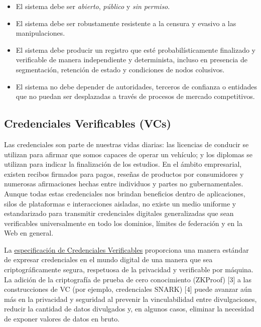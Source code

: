 \documentclass[11pt]{article}
\begin{document}
\begin{itemize}
	\item El sistema debe ser \textit{abierto}, \textit{público} y \textit{sin permiso}.

	\item El sistema debe ser robustamente resistente a la censura y evasivo a las manipulaciones.

	\item El sistema debe producir un registro que esté probabilísticamente finalizado y verificable de manera independiente y determinista, incluso en presencia de segmentación, retención de estado y condiciones de nodos colusivos.

	\item El sistema no debe depender de autoridades, terceros de confianza o entidades que no puedan ser desplazadas a través de procesos de mercado competitivos.

\vspace{1\baselineskip}
\end{itemize}
\subsection{Credenciales Verificables (VCs)}

\vspace{1\baselineskip}
Las credenciales son parte de nuestras vidas diarias: las licencias de conducir se utilizan para afirmar que somos capaces de operar un vehículo; y los diplomas se utilizan para indicar la finalización de los estudios. En el ámbito empresarial, existen recibos firmados para pagos, reseñas de productos por consumidores y numerosas afirmaciones hechas entre individuos y partes no gubernamentales. Aunque todas estas credenciales nos brindan beneficios dentro de aplicaciones, silos de plataformas e interacciones aisladas, no existe un medio uniforme y estandarizado para transmitir credenciales digitales generalizadas que sean verificables universalmente en todo los dominios, límites de federación y en la Web en general.

\vspace{1\baselineskip}
La \href{https://www.w3.org/TR/vc-data-model/}{\uline{\textcolor[HTML]{1155CC}{especificación de Credenciales Verificables}}} proporciona una manera estándar de expresar credenciales en el mundo digital de una manera que sea criptográficamente segura, respetuosa de la privacidad y verificable por máquina. La adición de la criptografía de prueba de cero conocimiento (ZKProof) [3] a las construcciones de VC (por ejemplo, credenciales SNARK) [4] puede avanzar aún más en la privacidad y seguridad al prevenir la vinculabilidad entre divulgaciones, reducir la cantidad de datos divulgados y, en algunos casos, eliminar la necesidad de exponer valores de datos en bruto.
\end{document}
